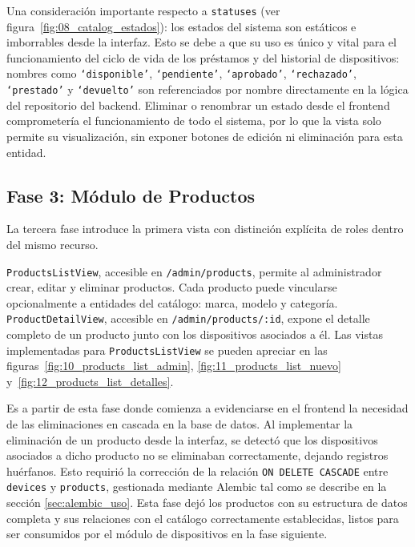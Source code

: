 Una consideración importante respecto a \texttt{statuses}
(ver figura~\ref{fig:08_catalog_estados}):
los estados del sistema 
son estáticos e imborrables desde la interfaz. Esto se debe a que su uso es único y 
vital para el funcionamiento del ciclo de vida de los préstamos y del historial de 
dispositivos: nombres como \texttt{`disponible'}, \texttt{`pendiente'}, 
\texttt{`aprobado'}, \texttt{`rechazado'}, \texttt{`prestado'} y 
\texttt{`devuelto'} son referenciados por nombre directamente en la lógica del 
repositorio del backend. Eliminar o renombrar un estado desde el frontend 
comprometería el funcionamiento de todo el sistema, por lo que la vista solo permite 
su visualización, sin exponer botones de edición ni eliminación para esta entidad.

\subsection{Fase 3: Módulo de Productos}

La tercera fase introduce la primera vista con distinción explícita de roles dentro 
del mismo recurso.

\texttt{ProductsListView}, accesible en \texttt{/admin/products}, permite al 
administrador crear, editar y eliminar productos. Cada producto puede vincularse 
opcionalmente a entidades del catálogo: marca, modelo y categoría. 
\texttt{ProductDetailView}, accesible en \texttt{/admin/products/:id}, expone el 
detalle completo de un producto junto con los dispositivos asociados a él.
Las vistas implementadas para \texttt{ProductsListView} se pueden apreciar en las 
figuras~\ref{fig:10_products_list_admin}, \ref{fig:11_products_list_nuevo} 
y~\ref{fig:12_products_list_detalles}.

Es a partir de esta fase donde comienza a evidenciarse en el frontend la necesidad 
de las eliminaciones en cascada en la base de datos. Al implementar la eliminación 
de un producto desde la interfaz, se detectó que los dispositivos asociados a dicho 
producto no se eliminaban correctamente, dejando registros huérfanos. Esto requirió 
la corrección de la relación \texttt{ON DELETE CASCADE} entre \texttt{devices} y 
\texttt{products}, gestionada mediante Alembic tal como se describe en la sección 
\ref{sec:alembic_uso}. Esta fase dejó los productos con su estructura de datos 
completa y sus relaciones con el catálogo correctamente establecidas, listos para 
ser consumidos por el módulo de dispositivos en la fase siguiente.

